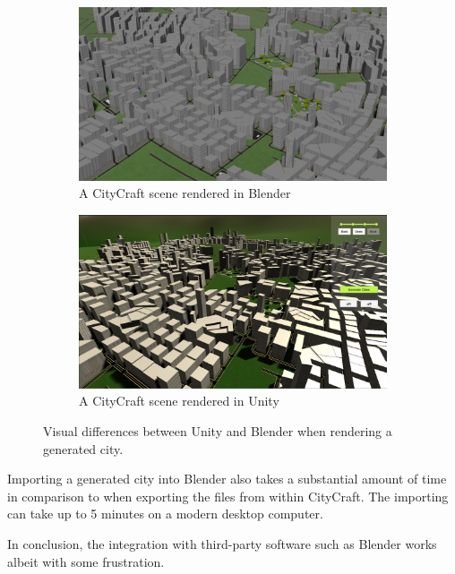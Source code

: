 \begin{figure}[h!]
  \centering
  \begin{subfigure}[b]{0.4\textwidth}
    \includegraphics[width=\textwidth]{figure/blender_unity_comparison_blender}
    \caption{A CityCraft scene rendered in Blender}
  \end{subfigure}
  \quad
  \begin{subfigure}[b]{0.4\textwidth}
    \includegraphics[width=\textwidth]{figure/blender_unity_comparison_unity}
    \caption{A CityCraft scene rendered in Unity}
  \end{subfigure}
  \caption{Visual differences between Unity and Blender when rendering a generated city.}
  \label{fig:blender_unity_comparison}
\end{figure}

Importing a generated city into Blender also takes a substantial amount of time in comparison to when exporting the files from within CityCraft.
The importing can take up to 5 minutes on a modern desktop computer.

In conclusion, the integration with third-party software such as Blender works albeit with some frustration.

